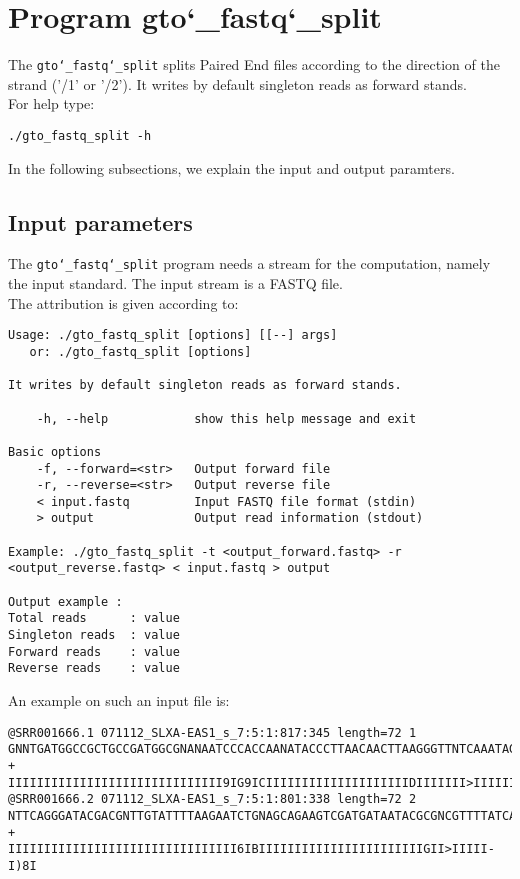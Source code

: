 \section{Program gto\char`_fastq\char`_split}
The \texttt{gto\char`_fastq\char`_split} splits Paired End files according to the direction of the strand ('/1' or '/2'). It writes by default singleton reads as forward stands. \\
For help type:
\begin{lstlisting}
./gto_fastq_split -h
\end{lstlisting}
In the following subsections, we explain the input and output paramters.

\subsection*{Input parameters}

The \texttt{gto\char`_fastq\char`_split} program needs a stream for the computation, namely the input standard. The input stream is a FASTQ file.\\
The attribution is given according to:
\begin{lstlisting}
Usage: ./gto_fastq_split [options] [[--] args]
   or: ./gto_fastq_split [options]

It writes by default singleton reads as forward stands.

    -h, --help            show this help message and exit

Basic options
    -f, --forward=<str>   Output forward file
    -r, --reverse=<str>   Output reverse file
    < input.fastq         Input FASTQ file format (stdin)
    > output         	  Output read information (stdout)

Example: ./gto_fastq_split -t <output_forward.fastq> -r <output_reverse.fastq> < input.fastq > output

Output example :
Total reads      : value
Singleton reads  : value
Forward reads    : value
Reverse reads    : value
\end{lstlisting}
An example on such an input file is:
\begin{lstlisting}
@SRR001666.1 071112_SLXA-EAS1_s_7:5:1:817:345 length=72 1
GNNTGATGGCCGCTGCCGATGGCGNANAATCCCACCAANATACCCTTAACAACTTAAGGGTTNTCAAATAGA
+
IIIIIIIIIIIIIIIIIIIIIIIIIIIIII9IG9ICIIIIIIIIIIIIIIIIIIIIDIIIIIII>IIIIII/
@SRR001666.2 071112_SLXA-EAS1_s_7:5:1:801:338 length=72 2
NTTCAGGGATACGACGNTTGTATTTTAAGAATCTGNAGCAGAAGTCGATGATAATACGCGNCGTTTTATCAN
+
IIIIIIIIIIIIIIIIIIIIIIIIIIIIIIII6IBIIIIIIIIIIIIIIIIIIIIIIIGII>IIIII-I)8I
\end{lstlisting}

